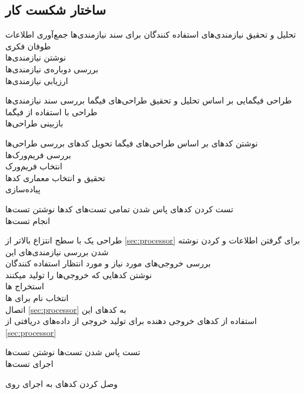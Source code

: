 \subsection{ساختار شکست کار}
\begin{wbsbox}{}
\begin{wbssub}
{تحلیل و تحقیق نیازمندی‌های استفاده کنندگان  برای }
{سند نیازمندی‌ها}
\task
جمع‌آوری اطلاعات \\
\task 
طوفان فکری \\
\task 
نوشتن نیازمندی‌ها \\
\task
بررسی دوباره‌ی نیازمندی‌ها \\
\task 
ارزیابی نیازمندی‌ها
\end{wbssub}

\begin{wbssub}
{طراحی فیگمایی  بر اساس تحلیل و تحقیق }
{طراحی‌های فیگما}
\task 
بررسی سند نیازمندی‌‌ها \\
\task 
طراحی با استفاده از فیگما \\
\task 
بازبینی طراحی‌ها
\end{wbssub}

\begin{wbssub}
{نوشتن کد‌‌های  بر اساس طراحی‌های فیگما}
{تحویل کد‌های }
\task 
بررسی طراحی‌ها \\
\task 
بررسی فریم‌ورک‌‌ها \\
\task 
انتخاب فریم‌ورک \\
\task 
تحقیق و انتخاب معماری کد‌ها \\
\task 
پیاده‌سازی
\end{wbssub}

\begin{wbssub}
{تست کردن کد‌های }
{پاس شدن تمامی تست‌های کد‌ها}
\task 
نوشتن تست‌ها \\
\task
انجام تست‌ها
\end{wbssub}

\begin{wbssub}
{طراحی یک  با سطح انتزاع بالاتر از \ref{sec:processor} برای گرفتن اطلاعات و  کردن}
{نوشته شدن }
\task
بررسی نیازمندی‌های این  \\
\task
بررسی خروجی‌های مورد نیاز و مورد انتظار استفاده کنندگان \\
\task
نوشتن کد‌هایی که خروجی‌ها را تولید میکنند \\
\task
استخراج ها \\
\task 
انتخاب نام برای ها \\
\task
اتصال 
\ref{sec:processor}
به کد‌های این  \\
\task
استفاده از کد‌‌های خروجی دهنده برای تولید خروجی از داده‌های دریافتی از 
\ref{sec:processor}
\end{wbssub}

\begin{wbssub}
{تست }
{پاس شدن تست‌ها}
\task 
نوشتن تست‌ها \\
\task
اجرای تست‌ها
\end{wbssub}

\begin{wbssub}
{وصل کردن کد‌های  به }
{اجرای  روی }
\end{wbssub}
\end{wbsbox}
